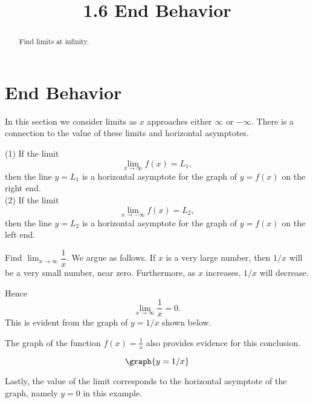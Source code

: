 \documentclass{ximera}
\title{1.6 End Behavior}
\begin{document}
\begin{abstract}
Find limits at infinity.
\end{abstract}

\maketitle

\section{End Behavior}
 




In this section we consider limits as $x$ approaches either $\infty$ or $-\infty$.
There is a connection to the value of these limits and horizontal asymptotes.

\begin{theorem}
(1) If the limit
\[
\lim_{x \to \infty} f(x) = L_1,
\]
then the line $y=L_1$ is a horizontal asymptote for the graph of $y = f(x)$ on the right end.\\
(2) If the limit
\[
\lim_{x \to -\infty} f(x) = L_2,
\]
then the line $y=L_2$ is a horizontal asymptote for the graph of $y = f(x)$ on the left end.
\end{theorem}



\begin{example}[example 1]
Find $\lim_{x \to \infty} \dfrac{1}{x}.$
  We argue as follows. If $x$ is a very large number, 
	then $1/x$ will be a very small number, near zero.  Furthermore, as $x$ increases, $1/x$ will decrease.
	
	Hence
	\[\lim_{x \to \infty} \frac{1}{x}= 0.\]
	This is evident from the graph of $y=1/x$ shown below.
	
	
	The graph of the function $f(x) = \frac{1}{x}$ also provides evidence for this conclusion.  
	
	\[\graph{y=1/x}\]
	
	Lastly, the value of the limit corresponds to the horizontal asymptote of the graph, namely
	$y = 0$ in this example.
\end{example}
\end{document}
